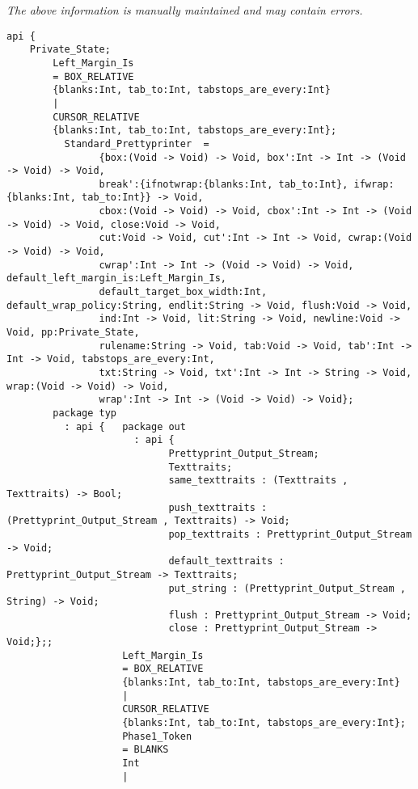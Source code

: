 \label{api:Standard\_Prettyprinter}

{\tiny \it The above information is manually maintained and may contain errors.}
\begin{verbatim}
api {
    Private_State;
        Left_Margin_Is
        = BOX_RELATIVE
        {blanks:Int, tab_to:Int, tabstops_are_every:Int}
        |
        CURSOR_RELATIVE
        {blanks:Int, tab_to:Int, tabstops_are_every:Int};
          Standard_Prettyprinter  =
                {box:(Void -> Void) -> Void, box':Int -> Int -> (Void -> Void) -> Void,
                break':{ifnotwrap:{blanks:Int, tab_to:Int}, ifwrap:{blanks:Int, tab_to:Int}} -> Void,
                cbox:(Void -> Void) -> Void, cbox':Int -> Int -> (Void -> Void) -> Void, close:Void -> Void,
                cut:Void -> Void, cut':Int -> Int -> Void, cwrap:(Void -> Void) -> Void,
                cwrap':Int -> Int -> (Void -> Void) -> Void, default_left_margin_is:Left_Margin_Is,
                default_target_box_width:Int, default_wrap_policy:String, endlit:String -> Void, flush:Void -> Void,
                ind:Int -> Void, lit:String -> Void, newline:Void -> Void, pp:Private_State,
                rulename:String -> Void, tab:Void -> Void, tab':Int -> Int -> Void, tabstops_are_every:Int,
                txt:String -> Void, txt':Int -> Int -> String -> Void, wrap:(Void -> Void) -> Void,
                wrap':Int -> Int -> (Void -> Void) -> Void};
        package typ
          : api {   package out
                      : api {
                            Prettyprint_Output_Stream;
                            Texttraits;
                            same_texttraits : (Texttraits , Texttraits) -> Bool;
                            push_texttraits : (Prettyprint_Output_Stream , Texttraits) -> Void;
                            pop_texttraits : Prettyprint_Output_Stream -> Void;
                            default_texttraits : Prettyprint_Output_Stream -> Texttraits;
                            put_string : (Prettyprint_Output_Stream , String) -> Void;
                            flush : Prettyprint_Output_Stream -> Void;
                            close : Prettyprint_Output_Stream -> Void;};;
                    Left_Margin_Is
                    = BOX_RELATIVE
                    {blanks:Int, tab_to:Int, tabstops_are_every:Int}
                    |
                    CURSOR_RELATIVE
                    {blanks:Int, tab_to:Int, tabstops_are_every:Int};
                    Phase1_Token
                    = BLANKS
                    Int
                    |

\end{verbatim}
